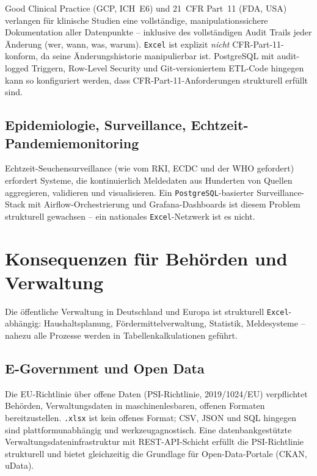 ﻿\documentclass[12pt,a4paper]{report}
\theoremstyle{definition}
\theoremstyle{remark}
\newcommand{\excel}{\texttt{Excel}}
\newcommand{\pg}{\texttt{PostgreSQL}}
\newcommand{\code}[1]{\texttt{#1}}
\begin{document}
Good Clinical Practice (GCP, ICH~E6) und 21~CFR Part~11 (FDA, USA)
verlangen für klinische Studien eine vollständige,
manipulationssichere Dokumentation aller Datenpunkte -- inklusive
des vollständigen Audit Trails jeder Änderung (wer, wann, was, warum).
\excel{} ist explizit \emph{nicht} CFR-Part-11-konform, da seine
Änderungshistorie manipulierbar ist.
PostgreSQL mit audit-logged Triggern, Row-Level Security und
Git-versioniertem ETL-Code hingegen kann so konfiguriert werden,
dass CFR-Part-11-Anforderungen strukturell erfüllt sind.

\subsection{Epidemiologie, Surveillance, Echtzeit-Pandemiemonitoring}

Echtzeit-Seuchensurveillance (wie vom RKI, ECDC und der WHO gefordert)
erfordert Systeme, die kontinuierlich Meldedaten aus Hunderten von
Quellen aggregieren, validieren und visualisieren.
Ein \pg-basierter Surveillance-Stack mit Airflow-Orchestrierung und
Grafana-Dashboards ist diesem Problem strukturell gewachsen --
ein nationales \excel-Netzwerk ist es nicht.

\section{Konsequenzen für Behörden und Verwaltung}

Die öffentliche Verwaltung in Deutschland und Europa ist strukturell
\excel-abhängig: Haushaltsplanung, Fördermittelverwaltung, Statistik,
Meldesysteme -- nahezu alle Prozesse werden in Tabellenkalkulationen
geführt.

\subsection{E-Government und Open Data}

Die EU-Richtlinie über offene Daten (PSI-Richtlinie,
2019/1024/EU) verpflichtet Behörden, Verwaltungsdaten in
maschinenlesbaren, offenen Formaten bereitzustellen.
\code{.xlsx} ist kein offenes Format; CSV, JSON und SQL hingegen sind
plattformunabhängig und werkzeugagnostisch.
Eine datenbankgestützte Verwaltungsdateninfrastruktur mit REST-API-Schicht
erfüllt die PSI-Richtlinie strukturell und bietet gleichzeitig die
Grundlage für Open-Data-Portale (CKAN, uData).
\end{document}

